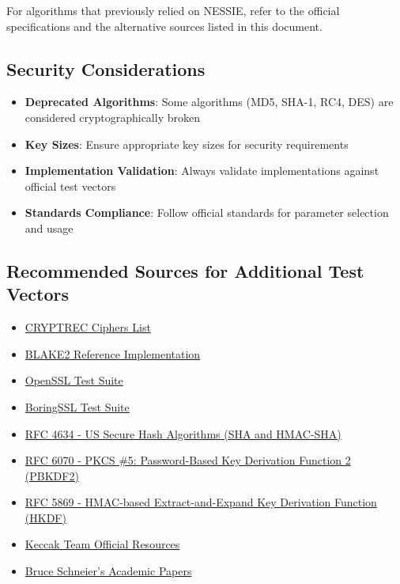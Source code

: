 \documentclass[12pt,a4paper]{article}
\newcommand{\link}[2]{\href{#1}{#2}}
\begin{document}
For algorithms that previously relied on NESSIE, refer to the official specifications and the alternative sources listed in this document.

\subsection{Security Considerations}

\begin{itemize}
    \item \textbf{Deprecated Algorithms}: Some algorithms (MD5, SHA-1, RC4, DES) are considered cryptographically broken
    \item \textbf{Key Sizes}: Ensure appropriate key sizes for security requirements
    \item \textbf{Implementation Validation}: Always validate implementations against official test vectors
    \item \textbf{Standards Compliance}: Follow official standards for parameter selection and usage
\end{itemize}

\subsection{Recommended Sources for Additional Test Vectors}

\begin{itemize}
    \item \link{https://www.cryptrec.go.jp/list.html}{CRYPTREC Ciphers List}
    \item \link{https://github.com/BLAKE2/BLAKE2}{BLAKE2 Reference Implementation}
    \item \link{https://github.com/openssl/openssl}{OpenSSL Test Suite}
    \item \link{https://github.com/boringssl/boringssl}{BoringSSL Test Suite}
    \item \link{https://www.ietf.org/rfc/rfc4634.txt}{RFC 4634 - US Secure Hash Algorithms (SHA and HMAC-SHA)}
    \item \link{https://www.ietf.org/rfc/rfc6070.txt}{RFC 6070 - PKCS \#5: Password-Based Key Derivation Function 2 (PBKDF2)}
    \item \link{https://www.ietf.org/rfc/rfc5869.txt}{RFC 5869 - HMAC-based Extract-and-Expand Key Derivation Function (HKDF)}
    \item \link{https://keccak.team/}{Keccak Team Official Resources}
    \item \link{https://www.schneier.com/academic/}{Bruce Schneier's Academic Papers}
\end{itemize}
\end{document}
